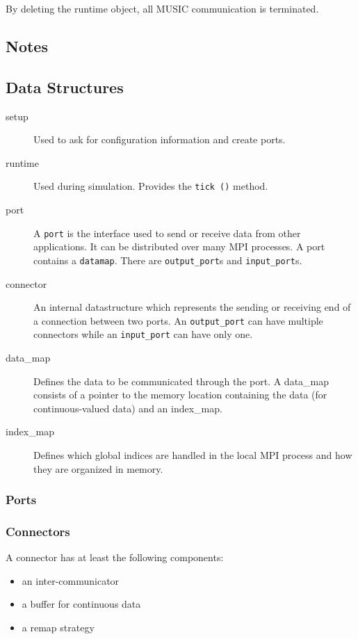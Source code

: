 \documentclass[a4paper]{report}
\begin{document}
  By deleting the runtime object, all MUSIC communication is terminated.


\begin{metatext}
\chapter{Notes}

\section{Data Structures}

\begin{description}
  \item[setup] Used to ask for configuration information and create
    ports.
  \item[runtime] Used during simulation.  Provides the \lstinline|tick ()|
    method.
  \item[port] A \lstinline|port| is the interface used to send or receive
    data from other applications.  It can be distributed over many MPI
    processes.  A port contains a \lstinline|datamap|.  There are
    \lstinline|output_port|s and \lstinline|input_port|s.
  \item[connector] An internal datastructure which represents the
    sending or receiving end of a connection between two ports.  An
    \lstinline|output_port| can have multiple connectors while an
    \lstinline|input_port| can have only one.
  \item[data\_map] Defines the data to be communicated through the
    port.  A data\_map consists of a pointer to the memory location
    containing the data (for continuous-valued data) and an
    index\_map.
  \item[index\_map] Defines which global indices are handled in the
    local MPI process and how they are organized in memory.
\end{description}

\subsection{Ports}

\subsection{Connectors}

A connector has at least the following components:
\begin{itemize}
  \item an inter-communicator
  \item a buffer for continuous data
  \item a remap strategy
\end{itemize}


\end{metatext}
\end{document}
